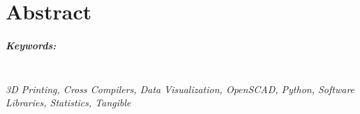 

\begingroup
\let\clearpage\relax
\let\cleardoublepage\relax
\let\cleardoublepage\relax

\chapter*{Abstract} %

\lipsum[1-2]

\endgroup			

\paragraph{Keywords:}\mbox{}\\
\textit{3D Printing, Cross Compilers, Data Visualization,
OpenSCAD, Python, Software Libraries, Statistics, Tangible}

\vfill
